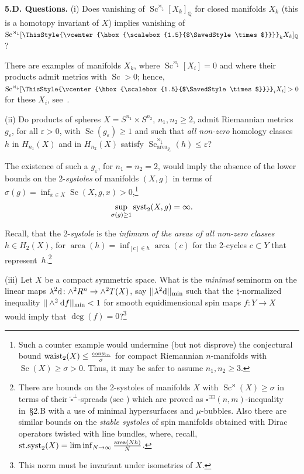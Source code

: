 \documentclass[10pt,a4paper]{amsart}
\numberwithin{equation}{section}
\newcommand\bigtimes{\mathbin{\ThisStyle{\vcenter{\hbox{%
\scalebox{1.5}{$\SavedStyle\times$}}}}}}
\begin{document}
 \textbf {5.D. Questions.} (i) Does vanishing of $\operatorname{Sc}^{\rtimes_\downarrow} [X_k]_{\mathbb Q}$ for closed manifolds $X_k$ (this is a homotopy invariant of $X$)
 implies vanishing of $\operatorname{Sc}^{\rtimes_\downarrow} [\bigtimes_kX_k]_{\mathbb Q}$?

There are examples of manifolds $X_k$, where
$\operatorname{Sc}^{\rtimes_\downarrow} [X_i]=0$ and where their products admit metrics with $\operatorname{Sc}>0$; hence,
 $\operatorname{Sc}^{\rtimes_\downarrow} [\bigtimes_iX_i]>0 $ for these $X_i$, see~\cite{GH2023}.

(ii) Do products of
spheres $X=S^{n_1}\times S^{n_2}$, $n_1,n_2\geq 2$, admit Riemannian metrics $g_\varepsilon$, for all $\varepsilon>0$, with $\operatorname{Sc}(g_\varepsilon)\geq 1$ and such that {\it all non-zero} homology classes $h$ in $H_{n_1}(X)$ and in $H_{n_2}(X)$ satisfy
$\operatorname{Sc}_{\operatorname{area}_{ g_\varepsilon}}^{\rtimes_\downarrow} (h)\leq \varepsilon$?

The existence of such a $g_\varepsilon$, for $n_1=n_2=2$, would imply
the absence of the lower bounds on the 2-{\it systoles} of manifolds $(X, g)$ in terms of $\sigma(g)=\inf_{x\in X} \operatorname{Sc} (X,g,x)>0$,\footnote{Such a counter example would undermine (but not disprove) the conjectural bound ${\rm waist}_2(X)\leq \frac{{\rm const}_n}{\sigma}$ for compact Riemannian $n$-manifolds with $\operatorname{Sc}(X)\geq \sigma>0$. Thus, it may be safer
to assume $n_1,n_2\geq 3$.}
\[
\sup_{\sigma(g)\geq 1} {\rm syst}_2(X, g)= \infty.
\]

Recall, that the 2-{\it systole} is the {\it infimum of the areas of all non-zero classes} $h\in H_2(X)$, for $\operatorname{area}(h)=\inf_{[c]\in h} \operatorname{area}(c)$ for the 2-cycles $c\subset Y$ that represent~$h$.\footnote{There are bounds on the 2-systoles of manifolds $X$ with $\operatorname{Sc}^\rtimes (X)\geq \sigma$ in terms of their $\tilde \square^\perp$-spreads (see
\cite{Ri2020, Ze2020}) which are proved as $\square^{\exists\exists}(n,m)$-inequality in~\S2.B with a use of minimal hypersurfaces and $\mu$-bubbles.
 Also there are similar bounds on the {\it stable systoles} of spin manifolds obtained with Dirac operators twisted with line bundles, where, recall,
 ${\rm st.syst}_2(X)=\liminf_{N\to \infty} \frac{\operatorname{area}(Nh)}{N}$.}

 (iii) Let $X$ be a compact symmetric space. What is the {\it minimal}
 seminorm on the linear maps $\lambda^2{\rm d}\colon  \mathbb \wedge^2R^n\to \wedge^2T(X)$,
say $||\lambda^2{\rm d}||_{\min}$ such that
 the $\natural$-normalized inequality $||\wedge^2{\rm d}f||_{\min} < 1$ for smooth equidimensional spin maps $f\colon Y\to X$ would imply
 that $\deg(f)=0$?\footnote{This norm must be invariant under isometries of $X$.}
\end{document}
